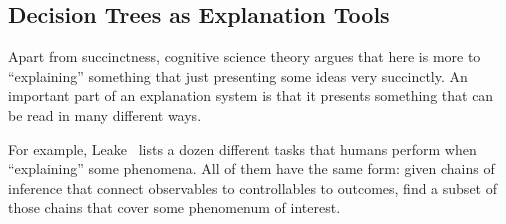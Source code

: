 \documentclass[runningheads]{llncs}
\newcommand{\bi}{\begin{itemize}}
\newcommand{\ei}{\end{itemize}}
\begin{document}







\subsection{Decision Trees as Explanation Tools}
Apart from succinctness, 
cognitive science theory argues that
here is more to ``explaining'' something that just
presenting some ideas very   succinctly. An important part of
an explanation system is that it presents something that
can be read in many different ways.

For example, Leake~\cite{leake91}
lists a dozen different tasks that humans perform when 
``explaining'' some phenomena. All of them have the same form:
given chains of inference that connect observables to controllables
to outcomes, find a subset of those chains that cover some phenomenum of
interest.
\end{document}
